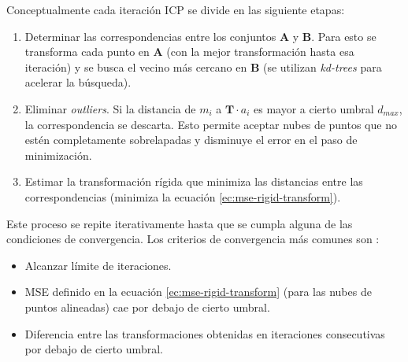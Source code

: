 Conceptualmente cada iteración ICP se divide en las siguiente etapas:
\begin{enumerate}

\item Determinar las correspondencias entre los conjuntos \textbf{A} y \textbf{B}. Para esto se transforma cada punto en \textbf{A} (con la mejor transformación hasta esa iteración) y se busca el vecino más cercano en \textbf{B} (se utilizan \textit{kd-trees} \cite{wiki-kdtree} para acelerar la búsqueda).

\item Eliminar \textit{outliers}. Si la distancia de $m_{i}$ a $\textbf{T} \cdot a_{i}$ es mayor a cierto umbral $d_{max}$, la correspondencia se descarta. Esto permite aceptar nubes de puntos que no estén completamente sobrelapadas y disminuye el error en el paso de minimización.

\item Estimar la transformación rígida que minimiza las distancias entre las correspondencias (minimiza la ecuación \ref{ec:mse-rigid-transform}).

\end{enumerate}

Este proceso se repite iterativamente hasta que se cumpla alguna de las condiciones de convergencia.
Los criterios de convergencia más comunes son :
\begin{itemize}
\item Alcanzar límite de iteraciones.

\item MSE definido en la ecuación \ref{ec:mse-rigid-transform} (para las nubes de puntos alineadas) cae por debajo de cierto umbral.

\item Diferencia entre las transformaciones obtenidas en iteraciones consecutivas por debajo de cierto umbral.
\end{itemize}

